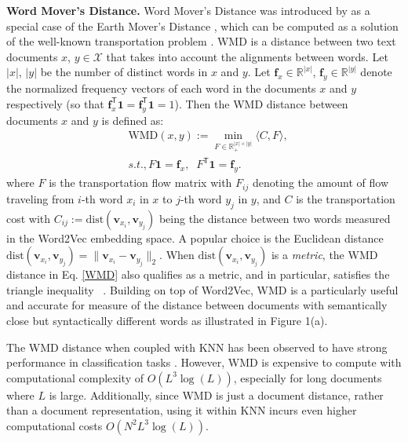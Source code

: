 \documentclass[11pt,a4paper]{article}
\newcommand{\R}{\mathbb{R}}
\newcommand{\X}{\mathcal{X}}
\newcommand{\1}{\boldsymbol{1}}
\newcommand{\bv}{\boldsymbol{v}}
\newcommand{\f}{\boldsymbol{f}}
\newcommand{\WMD}{\text{WMD}}
\newcommand{\T}{\mathsf{T}}
\begin{document}
\vskip0.1in
\noindent
\textbf{Word Mover's Distance.} 
Word Mover's Distance was introduced by \cite{kusner2015word} as a special case of the Earth Mover's Distance \cite{rubner2000earth}, which can be computed as a solution of the well-known transportation problem \cite{hitchcock1941distribution,altschuler2017near}. WMD is a distance between two text documents $x$, $y\in\X$ that takes into account the alignments between words. Let $|x|$, $|y|$ be the number of distinct words in $x$ and $y$. Let $\f_x\in\R^{|x|}$, $\f_y\in\R^{|y|}$ denote the normalized frequency vectors of each word in the documents $x$ and $y$ respectively (so that  $\f_x^{\T}\1=\f_y^{\T}\1=1$). Then the WMD distance between documents $x$ and $y$ is defined as:
\begin{equation}\label{WMD}
\begin{aligned}
& \WMD(x,y) := \min_{F\in\R_+^{|x|\times |y|}} \langle C, F \rangle, \\
&s.t., F\1=\f_x,\;\;F^{\T}\1=\f_y.
\end{aligned}
\end{equation}
where $F$ is the transportation flow matrix with $F_{ij}$ denoting the amount of flow traveling from $i$-th word $x_i$ in $x$ to $j$-th word $y_j$ in $y$, and $C$ is the transportation cost with $C_{ij}:=\text{dist}(\bv_{x_i},\bv_{y_j})$ being the distance between two words measured in the Word2Vec embedding space. A popular choice is the Euclidean distance $\text{dist}(\bv_{x_i},\bv_{y_j})=\|\bv_{x_i}-\bv_{y_j}\|_2$. When $\text{dist}(\bv_{x_i},\bv_{y_j})$ is a \emph{metric}, the WMD distance in Eq. \eqref{WMD} also qualifies as a metric, and in particular, satisfies the triangle inequality~ \cite{rubner2000earth}. Building on top of Word2Vec, WMD is a particularly useful and accurate for measure of the distance between documents with semantically close but syntactically different words as illustrated in Figure 1(a). 

The WMD distance when coupled with KNN has been observed to have strong performance in classification tasks \cite{kusner2015word}. However, WMD is expensive to compute with computational complexity of $O(L^3 \log(L))$, especially for long documents where $L$ is large. Additionally, since WMD is just a document distance, rather than a document representation, using it within KNN incurs even higher computational costs $O(N^2L^3 \log(L))$. 
\end{document}
